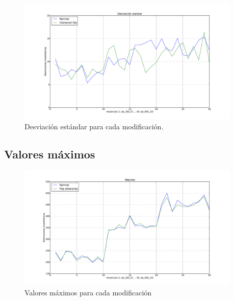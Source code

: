 \begin{figure}[H]
\begin{center}
\includegraphics[width=0.95\textwidth]{img/s-4.pdf}
\end{center}
\caption{Desviación estándar para cada modificación.}
\label{fig:s-4}
\end{figure}

\newpage

\subsection{Valores máximos}

\begin{figure}[H]
\begin{center}
\includegraphics[width=0.95\textwidth]{img/max-1.pdf}
\end{center}
\caption{Valores máximos para cada modificación}
\label{fig:max-1}
\end{figure}

